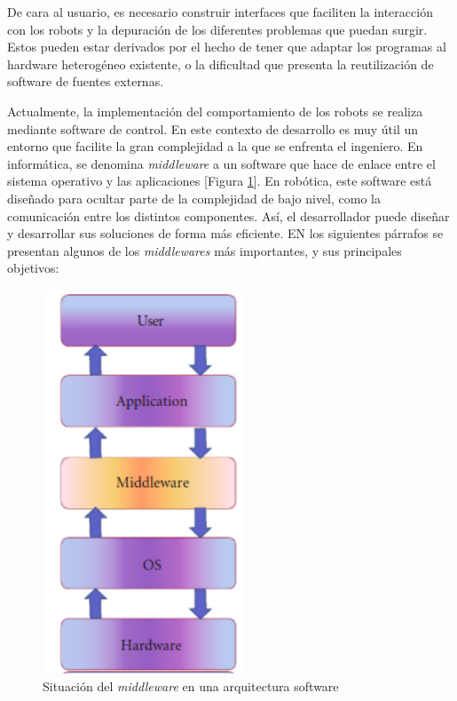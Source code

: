 \documentclass[12pt,spanish,chapterprefix, numbers=noenddot]{book}
\numberwithin{equation}{section}
\numberwithin{figure}{section}
\begin{document}
De cara al usuario, es necesario construir interfaces que faciliten la interacción con los robots y la depuración de los diferentes problemas que puedan surgir. Estos pueden estar derivados por el hecho de tener que adaptar los programas al hardware heterogéneo existente, o la dificultad que presenta la reutilización de software de fuentes externas. 

Actualmente, la implementación del comportamiento de los robots se realiza mediante software de control. En este contexto de desarrollo es muy útil un entorno que facilite la gran complejidad a la que se enfrenta el ingeniero. En informática, se denomina \textit{middleware} a un software que hace de enlace entre el sistema operativo y las aplicaciones [Figura \ref{fig:middleware}]. En robótica, este software está diseñado para ocultar parte de la complejidad de bajo nivel, como la comunicación entre los distintos componentes. Así, el desarrollador puede diseñar y desarrollar sus soluciones de forma más eficiente. EN los siguientes párrafos se presentan algunos de los \textit{middlewares} más importantes, y sus principales objetivos: 
\begin{figure}[hbt!]
\centering
\includegraphics[width=6cm]{Figs/layersMiddleware.png}
\par
\caption{\label{fig:middleware}Situación del \textit{middleware} en una arquitectura software}
\end{figure}
\end{document}
